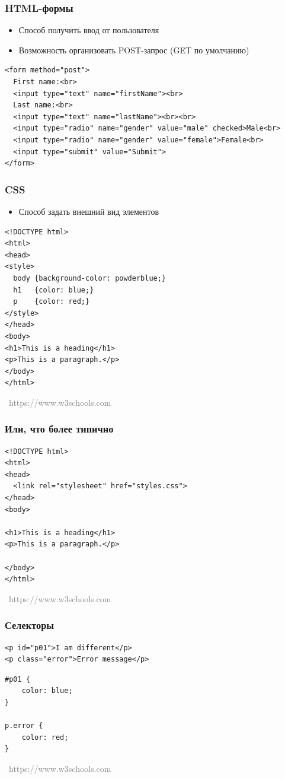 \documentclass[xetex,mathserif,serif]{beamer}
\newcommand{\attribution}[1] {
\vspace{-5mm}\begin{flushright}\begin{scriptsize}\textcolor{gray}{\textcopyright\, #1}\end{scriptsize}\end{flushright}
}
\begin{document}
    \begin{frame}[fragile]
        \frametitle{HTML-формы}
        \begin{itemize}
            \item Способ получить ввод от пользователя
            \item Возможность организовать POST-запрос (GET по умолчанию)
        \end{itemize}
        \begin{verbatim}
<form method="post">
  First name:<br>
  <input type="text" name="firstName"><br>
  Last name:<br>
  <input type="text" name="lastName"><br><br>
  <input type="radio" name="gender" value="male" checked>Male<br>
  <input type="radio" name="gender" value="female">Female<br>
  <input type="submit" value="Submit">
</form>
        \end{verbatim}
    \end{frame}

    \begin{frame}[fragile]
        \frametitle{CSS}
        \begin{itemize}
            \item Способ задать внешний вид элементов
        \end{itemize}
        \begin{verbatim}
<!DOCTYPE html>
<html>
<head>
<style>
  body {background-color: powderblue;}
  h1   {color: blue;}
  p    {color: red;}
</style>
</head>
<body>
<h1>This is a heading</h1>
<p>This is a paragraph.</p>
</body>
</html>
        \end{verbatim}
        \attribution{https://www.w3schools.com}
    \end{frame}

    \begin{frame}[fragile]
        \frametitle{Или, что более типично}
        \begin{verbatim}
<!DOCTYPE html>
<html>
<head>
  <link rel="stylesheet" href="styles.css">
</head>
<body>

<h1>This is a heading</h1>
<p>This is a paragraph.</p>

</body>
</html>
        \end{verbatim}
        \attribution{https://www.w3schools.com}
    \end{frame}

    \begin{frame}[fragile]
        \frametitle{Селекторы}
        \begin{verbatim}
<p id="p01">I am different</p>
<p class="error">Error message</p>
        \end{verbatim}
        \vspace{5mm}
        \begin{verbatim}
#p01 {
    color: blue;
}

p.error {
    color: red;
}
        \end{verbatim}
        \attribution{https://www.w3schools.com}
    \end{frame}
\end{document}
